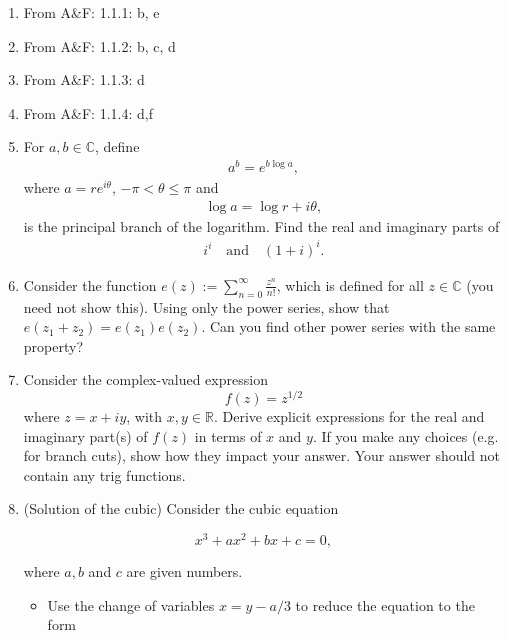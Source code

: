 \documentclass[10pt]{amsart}
\theoremstyle{nonumberplain}
\begin{document}
\mline
\begin{enumerate}[label={\bf {\arabic*}:}]
\item  From A\&F: 1.1.1: b, e \\
\item From A\&F: 1.1.2: b, c, d \\
\item From A\&F: 1.1.3: d \\
\item From A\&F: 1.1.4: d,f \\
\item For $a, b \in \mathbb C$, define
  \begin{align*}
    a^b = e^{b \log a},
  \end{align*}
  where $a = r e^{i \theta}$, $- \pi < \theta \leq \pi$ and
  \begin{align*}
    \log a = \log r + i \theta,
  \end{align*}
  is the principal branch of the logarithm.  Find the real and
  imaginary parts of
  \begin{align*}
    i^i \quad \text{and} \quad (1 + i)^i.
  \end{align*}
  
\item Consider the function $e(z):=\sum_{n=0}^{\infty}
  \frac{z^n}{n!}$, which is defined for all $z \in \mathbb{C}$ (you
  need not show this). Using only the power series, show that
  $e\left(z_1+z_2\right)=e\left(z_1\right) e\left(z_2\right)$. Can you
  find other power series with the same property? \\



  
\item Consider the complex-valued expression
$$
f(z)=z^{1 / 2}
$$
where $z=x+i y$, with $x, y \in \mathbb{R}$. Derive explicit
expressions for the real and imaginary part(s) of $f(z)$ in terms of
$x$ and $y$. If you make any choices (e.g. for branch cuts), show how
they impact your answer. Your answer should not contain any trig
functions.\\

\item (Solution of the cubic) Consider the cubic equation

$$
x^3+a x^2+b x+c=0,
$$

where $a, b$ and $c$ are given numbers.
\begin{itemize}
\item Use the change of variables $x=y-a / 3$ to reduce the equation to the form


\end{itemize}
\end{enumerate}
\end{document}
